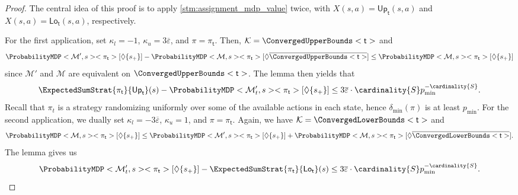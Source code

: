 \documentclass{article}
\newcommand{\MDP}{\mathcal{M}}
\newcommand{\States}{S}
\newcommand{\strategy}{\pi}
\newcommand{\reach}{\Diamond}
\newcommand{\upperbound}{\mathsf{Up}}
\newcommand{\lowerbound}{\mathsf{Lo}}
\newcommand{\targetstate}{s_+}
\newcommand{\updatestep}{{\overline{\varepsilon}}}
\newcommand{\algostep}{\mathsf{t}}
\begin{document}
\begin{proof}
	The central idea of this proof is to apply \cref{stm:assignment_mdp_value} twice, with $X(s, a) = \upperbound_\algostep(s, a)$ and $X(s, a) = \lowerbound_\algostep(s, a)$, respectively.

	For the first application, set $\kappa_l = -1$, $\kappa_u = 3 \updatestep$, and $\strategy = \strategy_\algostep$.
	Then, $\mathcal{K} = \ConvergedUpperBounds<\algostep>$ and
	\begin{equation}
		\ProbabilityMDP<\MDP', s><\strategy_\algostep>[\reach \{\targetstate\}] - \ProbabilityMDP<\MDP, s><\strategy_\algostep>[\reach \overline{\ConvergedUpperBounds<\algostep>}] \leq \ProbabilityMDP<\MDP, s><\strategy_\algostep>[\reach \{\targetstate\}] \label{eq:stm:dql_no_ec:bounds_close:up_probs}
	\end{equation}
	since $\MDP'$ and $\MDP$ are equivalent on $\ConvergedUpperBounds<\algostep>$.
	The lemma then yields that
	\begin{equation}
		\ExpectedSumStrat{\strategy_\algostep}{\upperbound_\algostep}(s) - \ProbabilityMDP<\MDP'_t, s><\strategy_\algostep>[\reach \{\targetstate\}] \leq 3 \updatestep \cdot \cardinality{\States} p_{\min}^{-\cardinality{\States}}. \label{eq:stm:dql_no_ec:bounds_close:up_strat}
	\end{equation}
	Recall that $\strategy_t$ is a strategy randomizing uniformly over some of the available actions in each state, hence $\delta_{\min}(\strategy)$ is at least $p_{\min}$.
	For the second application, we dually set $\kappa_l = - 3 \updatestep$, $\kappa_u = 1$, and $\strategy = \strategy_\algostep$.
	Again, we have $\mathcal{K} = \ConvergedLowerBounds<\algostep>$ and
	\begin{equation}
		\ProbabilityMDP<\MDP, s><\strategy_\algostep>[\reach \{\targetstate\}] \leq \ProbabilityMDP<\MDP', s><\strategy_\algostep>[\reach \{\targetstate\}] + \ProbabilityMDP<\MDP, s><\strategy_\algostep>[\reach \overline{\ConvergedLowerBounds<\algostep>}]. \label{eq:stm:dql_no_ec:bounds_close:low_probs}
	\end{equation}
	The lemma gives us
	\begin{equation}
		\ProbabilityMDP<\MDP'_t, s><\strategy_\algostep>[\reach \{\targetstate\}] - \ExpectedSumStrat{\strategy_\algostep}{\lowerbound_\algostep}(s) \leq 3 \updatestep \cdot \cardinality{\States} p_{\min}^{-\cardinality{\States}}. \label{eq:stm:dql_no_ec:bounds_close:low_strat}
	\end{equation}


\end{proof}
\end{document}
